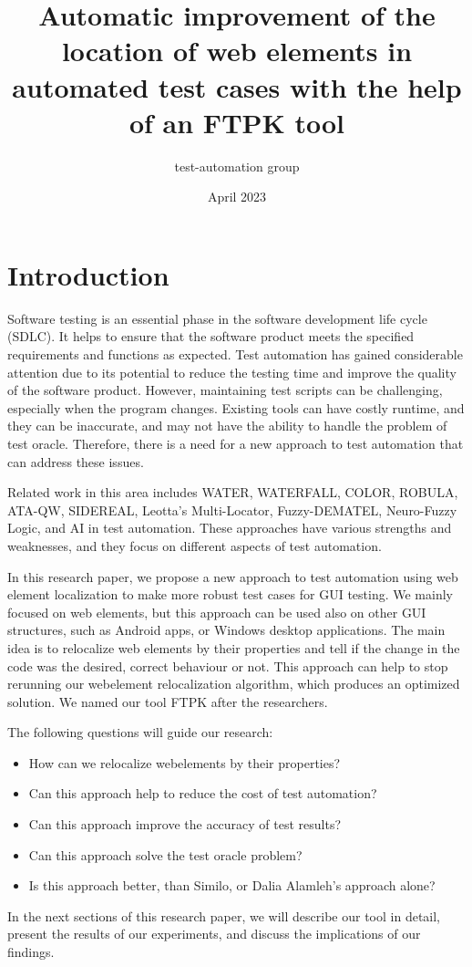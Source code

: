 \documentclass{article}
\title{Automatic improvement of the location of web elements in automated test cases with the help of an FTPK tool}
\author{test-automation group }
\date{April 2023}
\begin{document}
\maketitle

\section{Introduction}

Software testing is an essential phase in the software development life cycle (SDLC). It helps to ensure that the software product meets the specified requirements and functions as expected. Test automation has gained considerable attention due to its potential to reduce the testing time and improve the quality of the software product. However, maintaining test scripts can be challenging, especially when the program changes. Existing tools can have costly runtime, and they can be inaccurate, and may not have the ability to handle the problem of test oracle. Therefore, there is a need for a new approach to test automation that can address these issues.

Related work in this area includes WATER, WATERFALL, COLOR, ROBULA, ATA-QW, SIDEREAL, Leotta's Multi-Locator, Fuzzy-DEMATEL, Neuro-Fuzzy Logic, and AI in test automation. These approaches have various strengths and weaknesses, and they focus on different aspects of test automation.

In this research paper, we propose a new approach to test automation using web element localization to make more robust test cases for GUI testing. We mainly focused on web elements, but this approach can be used also on other GUI structures, such as Android apps, or Windows desktop applications. The main idea is to relocalize web elements by their properties and tell if the change in the code was the desired, correct behaviour or not. This approach can help to stop rerunning our webelement relocalization algorithm, which produces an optimized solution. We named our tool FTPK after the researchers.

The following questions will guide our research:

\begin{itemize}
\item How can we relocalize webelements by their properties?
\item Can this approach help to reduce the cost of test automation?
\item Can this approach improve the accuracy of test results?
\item Can this approach solve the test oracle problem?
\item Is this approach better, than Similo, or Dalia Alamleh's approach alone?
\end{itemize}

In the next sections of this research paper, we will describe our tool in detail, present the results of our experiments, and discuss the implications of our findings.
\end{document}
